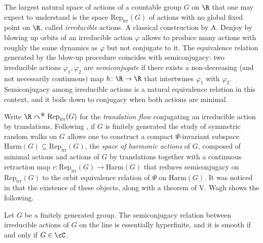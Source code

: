 \documentclass[reqno]{amsart}
\begin{document}
The largest natural space of actions of a countable group $G$ on $\R$ that one may expect to understand is the space $\mathrm{Rep}_\mathrm{irr}(G)$ of actions with no global fixed point on $\R$, called \emph{irreducible} actions. A classical construction by A. Denjoy \cite{Denjoy1932} by blowing up orbits of an irreducible action $\varphi$ allows to produce many actions with roughly the same dynamics as $\varphi$ but not conjugate to it. The equivalence relation generated by the blow-up procedure coincides with semiconjugacy: two irreducible actions $\varphi_1, \varphi_2$ are \emph{semiconjugate} if there exists a non-decreasing (and not necessarily continuous) map $h \colon \R \to \R$ that intertwines $\varphi_1$ with $\varphi_2$. Semiconjugacy among irreducible actions is a natural equivalence relation in this context, and it boils down to conjugacy when both actions are minimal.

Write $\R \curvearrowright^\Psi \mathrm{Rep}_\mathrm{irr}(G)$ for the \emph{translation flow} conjugating an irreducible action by translations. Following \cite{DKNP, deroinAlmost}, if $G$ is finitely generated the study of symmetric random walks on $G$ allows one to construct a compact $\Psi$-invariant subspace $\mathrm{Harm}(G) \subseteq \mathrm{Rep}_\mathrm{irr}(G)$, the \emph{space of harmonic actions} of $G$, composed of minimal actions and actions of $G$ by translations together with a continuous retraction map $r \colon \mathrm{Rep}_\mathrm{irr}(G) \to \mathrm{Harm}(G)$ that reduces semiconjugacy on $\mathrm{Rep}_\mathrm{irr}(G)$ to the orbit equivalence relation of $\Psi$ on $\mathrm{Harm}(G)$. It was noticed in \cite[Section 14.4]{BMRT} that the existence of these objects, along with a theorem of V. Wagh \cite{Wagh1988} shows the following.

\begin{prop}
	Let $G$ be a finitely generated group. The semiconjugacy relation between irreducible actions of $G$ on the line is essentially hyperfinite, and it is smooth if and only if $G \in \cC$.
\end{prop}
\end{document}

